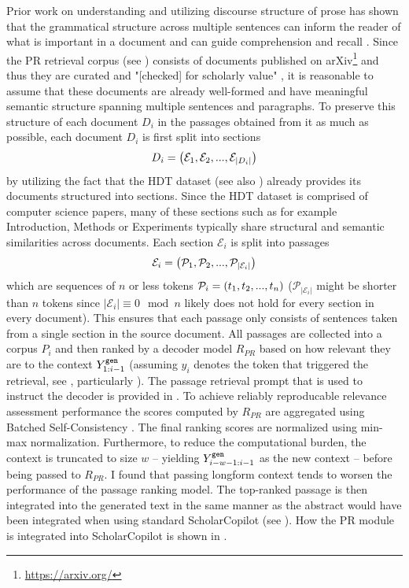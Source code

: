 Prior work on understanding and utilizing discourse structure of prose has shown that the grammatical structure across multiple sentences can inform the reader of what is important in a document \cite{rumelhart1975storyschemata} and can guide comprehension and recall \cite{mandler1978storyschemainretrieval}. Since the PR retrieval corpus (see ) consists of documents published on arXiv\footnote{\url{https://arxiv.org/}} and thus they are curated and "[checked] for scholarly value" \cite{arxivstaff2025aboutarxiv}, it is reasonable to assume that these documents are already well-formed and have meaningful semantic structure spanning multiple sentences and paragraphs. To preserve this structure of each document $D_i$ in the passages obtained from it as much as possible, each document $D_i$ is first split into sections
\begin{align}\label{eq:sections}
    D_i=\left({\mathcal{E}_1,\mathcal{E}_2,...,\mathcal{E}_{|D_i|}}\right)
\end{align}
by utilizing the fact that the HDT dataset \cite{He2024HDT} (see also ) already provides its documents structured into sections. Since the HDT dataset is comprised of computer science papers, many of these sections such as for example Introduction, Methods or Experiments typically share structural and semantic similarities across documents.  Each section $\mathcal{E}_i$ is split into passages
\begin{align}\label{eq:passages}
    \mathcal{E}_i=\left({\mathcal{P}_1,\mathcal{P}_2,...,\mathcal{P}_{|\mathcal{E}_i|}}\right)    
\end{align}
which are sequences of $n$ or less tokens $\mathcal{P}_i=\left({t_1,t_2,...,t_n}\right)$ ($\mathcal{P}_{|\mathcal{E}_i|}$ might be shorter than $n$ tokens since $|\mathcal{E}_i|\equiv0\mod n$ likely does not hold for every section in every document). This ensures that each passage only consists of sentences taken from a single section in the source document. All passages are collected into a corpus $P_i$ and then ranked by a decoder model $R_{PR}$ based on how relevant they are to the context $Y^{\texttt{gen}}_{1:i-1}$ (assuming $y_i$ denotes the \mono{[RET]} token that triggered the retrieval, see , particularly ). The passage retrieval prompt that is used to instruct the decoder is provided in . To achieve reliably reproducable relevance assessment performance the scores computed by $R_{PR}$ are aggregated using Batched Self-Consistency \cite{korikov2025batched}. The final ranking scores are normalized using min-max normalization. Furthermore, to reduce the computational burden, the context is truncated to size $w$ -- yielding $Y^{\texttt{gen}}_{i-w-1:i-1}$ as the new context -- before being passed to $R_{PR}$. I found that passing longform context tends to worsen the performance of the passage ranking model. The top-ranked passage is then integrated into the generated text in the same manner as the abstract would have been integrated when using standard ScholarCopilot (see ). How the PR module is integrated into ScholarCopilot is shown in .

